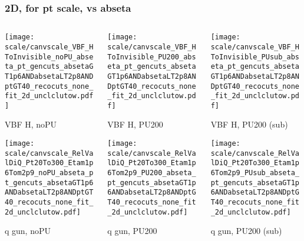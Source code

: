 \documentclass[8pt]{beamer}
\begin{document}
   \begin{frame}
  \frametitle{2D, for pt scale, vs abseta}
  
  \begin{columns}
   \begin{column}{0.35\textwidth}
     \texttt{[image: scale/canvscale\_VBF\_HToInvisible\_noPU\_abseta\_pt\_gencuts\_absetaGT1p6ANDabsetaLT2p8ANDptGT40\_recocuts\_none\_fit\_2d\_unclclutow.pdf]}
     
     VBF H, noPU
    
     \texttt{[image: scale/canvscale\_RelValDiQ\_Pt20To300\_Etam1p6Tom2p9\_noPU\_abseta\_pt\_gencuts\_absetaGT1p6ANDabsetaLT2p8ANDptGT40\_recocuts\_none\_fit\_2d\_unclclutow.pdf]}
     
     q gun, noPU
   \end{column}
   \begin{column}{0.35\textwidth}
     \texttt{[image: scale/canvscale\_VBF\_HToInvisible\_PU200\_abseta\_pt\_gencuts\_absetaGT1p6ANDabsetaLT2p8ANDptGT40\_recocuts\_none\_fit\_2d\_unclclutow.pdf]}
     
     VBF H, PU200
    
     \texttt{[image: scale/canvscale\_RelValDiQ\_Pt20To300\_Etam1p6Tom2p9\_PU200\_abseta\_pt\_gencuts\_absetaGT1p6ANDabsetaLT2p8ANDptGT40\_recocuts\_none\_fit\_2d\_unclclutow.pdf]}
     
     q gun, PU200
   \end{column}
   \begin{column}{0.35\textwidth}
     \texttt{[image: scale/canvscale\_VBF\_HToInvisible\_PUsub\_abseta\_pt\_gencuts\_absetaGT1p6ANDabsetaLT2p8ANDptGT40\_recocuts\_none\_fit\_2d\_unclclutow.pdf]}
     
     VBF H, PU200 (sub)
    
     \texttt{[image: scale/canvscale\_RelValDiQ\_Pt20To300\_Etam1p6Tom2p9\_PUsub\_abseta\_pt\_gencuts\_absetaGT1p6ANDabsetaLT2p8ANDptGT40\_recocuts\_none\_fit\_2d\_unclclutow.pdf]}
     
     q gun, PU200 (sub)
   \end{column}
  \end{columns}
 \end{frame}
 
\end{document}
